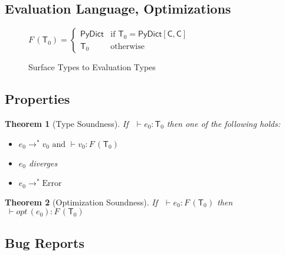 \documentclass[english,cleveref,submission]{programming}
\newcommand{\mfeq}{=}
\newcommand{\typefont}[1]{\mathsf{#1}}
\newcommand{\paramtype}[2]{#1[#2]}
\newcommand{\sptype}{\typefont{T}}
\newcommand{\sptclass}{\typefont{C}}
\newcommand{\sptrawpydict}{\typefont{PyDict}}
\newcommand{\sptpydict}[2]{\paramtype{\sptrawpydict}{#1, #2}}
\newcommand{\spexpr}{e}
\newcommand{\spvalue}{v}
\newcommand{\sprred}{\rightarrow^*}
\newcommand{\mfapply}[2]{#1\,(#2)}
\newcommand{\mffont}[1]{\mathit{#1}}
\newcommand{\mftypeF}[1]{\mfapply{\mffont{F}}{#1}}
\newcommand{\mfopt}[1]{\mfapply{\mffont{opt}}{#1}}
\newcommand{\sperror}{\mathrm{Error}}
\newtheorem{theorem}{Theorem}
\begin{document}
\subsection{Evaluation Language, Optimizations}

\begin{figure}[t]
  \(
    \mftypeF{\sptype_0}
    \mfeq
    \left\{\begin{array}{ll}
      \sptrawpydict & \mbox{if $\sptype_0 = \sptpydict{\sptclass}{\sptclass}$}
    \\
      \sptype_0 & \mbox{otherwise}
    \end{array}\right.
  \)

  \caption{Surface Types to Evaluation Types}
  \label{f:surface-to-eval-types}
\end{figure}


\subsection{Properties}

\begin{theorem}[Type Soundness]
  If\ \(~\vdash \spexpr_0 : \sptype_0\)
  then one of the following holds:
  \begin{itemize}
    \item
      \(\spexpr_0 \sprred \spvalue_0
        \mbox{ and }
        \vdash \spvalue_0 : \mftypeF{\sptype_0}
      \)
    \item
      \(\spexpr_0\) diverges
    \item
      \(\spexpr_0 \sprred \sperror\)
  \end{itemize}
\end{theorem}

\begin{theorem}[Optimization Soundness]
  If\ \(~\vdash \spexpr_0 : \mftypeF{\sptype_0}\)
  then\ \(~\vdash \mfopt{\spexpr_0} : \mftypeF{\sptype_0}\)
\end{theorem}



\subsection{Bug Reports}
\end{document}
